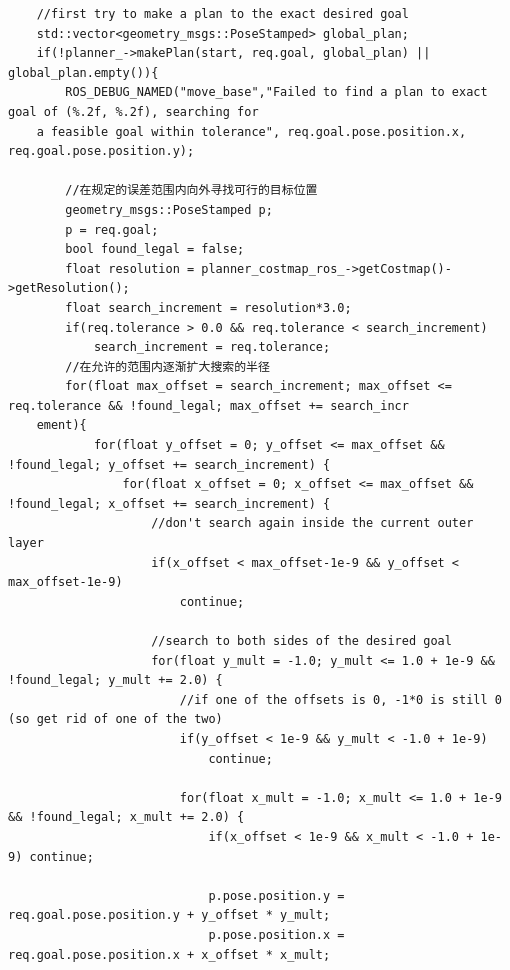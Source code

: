 \documentclass[9pt, oneside]{book}
\begin{document}
\scriptsize
\begin{verbatim}
    //first try to make a plan to the exact desired goal
    std::vector<geometry_msgs::PoseStamped> global_plan;
    if(!planner_->makePlan(start, req.goal, global_plan) || global_plan.empty()){
        ROS_DEBUG_NAMED("move_base","Failed to find a plan to exact goal of (%.2f, %.2f), searching for 
    a feasible goal within tolerance", req.goal.pose.position.x, req.goal.pose.position.y);

        //在规定的误差范围内向外寻找可行的目标位置
        geometry_msgs::PoseStamped p;
        p = req.goal;
        bool found_legal = false;
        float resolution = planner_costmap_ros_->getCostmap()->getResolution();
        float search_increment = resolution*3.0;
        if(req.tolerance > 0.0 && req.tolerance < search_increment) 
            search_increment = req.tolerance;
        //在允许的范围内逐渐扩大搜索的半径
        for(float max_offset = search_increment; max_offset <= req.tolerance && !found_legal; max_offset += search_incr
    ement){
            for(float y_offset = 0; y_offset <= max_offset && !found_legal; y_offset += search_increment) {
                for(float x_offset = 0; x_offset <= max_offset && !found_legal; x_offset += search_increment) {
                    //don't search again inside the current outer layer
                    if(x_offset < max_offset-1e-9 && y_offset < max_offset-1e-9) 
                        continue;

                    //search to both sides of the desired goal
                    for(float y_mult = -1.0; y_mult <= 1.0 + 1e-9 && !found_legal; y_mult += 2.0) {
                        //if one of the offsets is 0, -1*0 is still 0 (so get rid of one of the two)
                        if(y_offset < 1e-9 && y_mult < -1.0 + 1e-9) 
                            continue;

                        for(float x_mult = -1.0; x_mult <= 1.0 + 1e-9 && !found_legal; x_mult += 2.0) {
                            if(x_offset < 1e-9 && x_mult < -1.0 + 1e-9) continue;

                            p.pose.position.y = req.goal.pose.position.y + y_offset * y_mult;
                            p.pose.position.x = req.goal.pose.position.x + x_offset * x_mult;


\end{verbatim}
\end{document}
